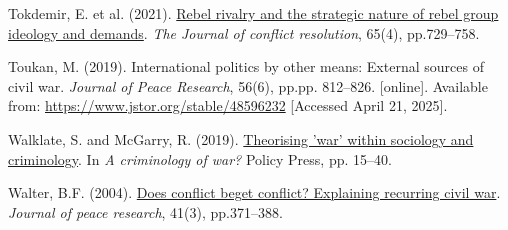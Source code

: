 \documentclass[
]{article}
\newlength{\cslhangindent}
\newenvironment{CSLReferences}[2] %
 {\begin{list}{}{%
  \setlength{\itemindent}{0pt}
  \setlength{\leftmargin}{0pt}
  \setlength{\parsep}{0pt}
  \ifodd #1
   \setlength{\leftmargin}{\cslhangindent}
   \setlength{\itemindent}{-1\cslhangindent}
  \fi
  \setlength{\itemsep}{#2\baselineskip}}}
 {\end{list}}
\begin{document}
\begin{CSLReferences}{0}{1}
Tokdemir, E. et al. (2021).
\href{https://doi.org/10.1177/0022002720967411}{Rebel rivalry and the
strategic nature of rebel group ideology and demands}. \emph{The Journal
of conflict resolution}, 65(4), pp.729--758.

Toukan, M. (2019). International politics by other means: External
sources of civil war. \emph{Journal of Peace Research}, 56(6), pp.pp.
812--826. {[}online{]}. Available from:
\url{https://www.jstor.org/stable/48596232} {[}Accessed April 21,
2025{]}.

Walklate, S. and McGarry, R. (2019).
\href{https://doi.org/10.51952/9781529202618.ch002}{Theorising 'war'
within sociology and criminology}. In \emph{A criminology of war?}
Policy Press, pp. 15--40.

Walter, B.F. (2004).
\href{https://doi.org/10.1177/0022343304043775}{Does conflict beget
conflict? Explaining recurring civil war}. \emph{Journal of peace
research}, 41(3), pp.371--388.

\end{CSLReferences}
\end{document}
